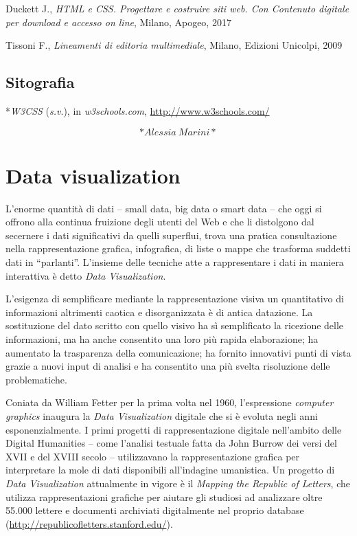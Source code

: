 \documentclass[
  b5paper,
  twoside,
  12pt,
  chapterprefix=false,
  bibliography=totocnumbered,
  parskip=false]{scrbook}
\begin{document}
Duckett J., \emph{HTML e CSS. Progettare e costruire siti web. Con Contenuto
digitale per download e accesso on line}, Milano, Apogeo, 2017

Tissoni F., \emph{Lineamenti di editoria multimediale}, Milano, Edizioni
Unicolpi, 2009

\hypertarget{sitografia-6}{%
\section*{Sitografia}\label{sitografia-6}}

*\emph{W3CSS} (\emph{s.v}.), in \emph{w3schools.com},
\url{http://www.w3schools.com/}

\[*Alessia~Marini*\]

\hypertarget{data-visualization}{%
\chapter{Data visualization}\label{data-visualization}}

L'enorme quantità di dati -- small data, big data o smart data -- che
oggi si offrono alla continua fruizione degli utenti del Web e che li
distolgono dal secernere i dati significativi da quelli superflui, trova
una pratica consultazione nella rappresentazione grafica, infografica,
di liste o mappe che trasforma suddetti dati in \enquote{parlanti}. L'insieme
delle tecniche atte a rappresentare i dati in maniera interattiva è
detto \emph{Data} \emph{Visualization}.

L'esigenza di semplificare mediante la rappresentazione visiva un
quantitativo di informazioni altrimenti caotica e disorganizzata è di
antica datazione. La sostituzione del dato scritto con quello visivo ha
sì semplificato la ricezione delle informazioni, ma ha anche consentito
una loro più rapida elaborazione; ha aumentato la trasparenza della
comunicazione; ha fornito innovativi punti di vista grazie a nuovi input
di analisi e ha consentito una più svelta risoluzione delle
problematiche.

Coniata da William Fetter per la prima volta nel 1960, l'espressione
\emph{computer} \emph{graphics} inaugura la \emph{Data Visualization} digitale che si è
evoluta negli anni esponenzialmente. I primi progetti di
rappresentazione digitale nell'ambito delle Digital Humanities -- come
l'analisi testuale fatta da John Burrow dei versi del XVII e del XVIII
secolo -- utilizzavano la rappresentazione grafica per interpretare la
mole di dati disponibili all'indagine umanistica. Un progetto di \emph{Data
Visualization} attualmente in vigore è il \emph{Mapping the Republic of
Letters}, che utilizza rappresentazioni grafiche per aiutare gli
studiosi ad analizzare oltre 55.000 lettere e documenti archiviati
digitalmente nel proprio database
(\url{http://republicofletters.stanford.edu/}).
\end{document}
